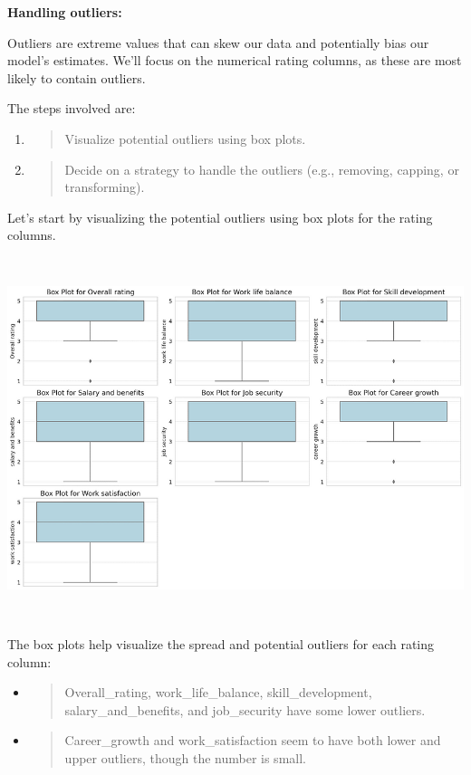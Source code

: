 \documentclass[
]{article}
\begin{document}
\textbf{Handling outliers:}

Outliers are extreme values that can skew our data and potentially bias
our model's estimates. We'll focus on the numerical rating columns, as
these are most likely to contain outliers.

The steps involved are:

\begin{enumerate}
\def\labelenumi{\arabic{enumi}.}
\item
  \begin{quote}
  Visualize potential outliers using box plots.
  \end{quote}
\item
  \begin{quote}
  Decide on a strategy to handle the outliers (e.g., removing, capping,
  or transforming).
  \end{quote}
\end{enumerate}

Let's start by visualizing the potential outliers using box plots for
the rating columns.

\includegraphics[width=5.26806in,height=4.16181in]{image11.png}

The box plots help visualize the spread and potential outliers for each
rating column:

\begin{itemize}
\item
  \begin{quote}
  Overall\_rating, work\_life\_balance, skill\_development,
  salary\_and\_benefits, and job\_security have some lower outliers.
  \end{quote}
\item
  \begin{quote}
  Career\_growth and work\_satisfaction seem to have both lower and
  upper outliers, though the number is small.
  \end{quote}
\end{itemize}
\end{document}

